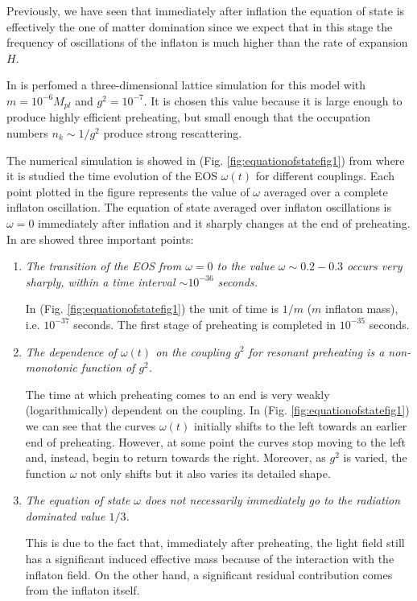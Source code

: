 \documentclass[11pt,a4paper,twoside]{book}
\begin{document}
Previously, we have seen that  immediately after inflation the equation of state is effectively the one of matter domination since we expect that in this stage the frequency of oscillations of the inflaton  is much higher than the rate of expansion $ H $.

In \cite{Chap7:Peloso_Thermalization} is perfomed a three-dimensional lattice simulation for this model with $ m=10^{-6} M_{pl} $ and $ g^{2}=10^{-7} $. It is chosen this value because it is large enough to produce highly efficient preheating, but small enough that the occupation numbers $ n_{k} \sim 1/g^{2}$ produce strong rescattering.

The numerical simulation is showed in (Fig. \ref{fig:equationofstatefig1}) from \cite{Chap7:Peloso_Thermalization} where it is studied the time evolution of the EOS $ \omega(t) $ for different couplings.
Each point plotted in the figure represents the value of $\omega$ averaged over a complete inflaton oscillation. The equation of state averaged over inflaton oscillations is $\omega = 0$ immediately after inflation and it sharply changes at the end of preheating. In \cite{Chap7:Peloso_Thermalization} are showed  three important points:
\begin{enumerate}
	\item \textit{The transition of the EOS from $\omega=0$ to the value $\omega \sim 0.2-0.3$ occurs very sharply, within a time interval $\sim 10^{-36}$ seconds.}
	
	In (Fig. \ref{fig:equationofstatefig1}) the unit of time is $ 1/m $ ($ m $ inflaton mass), i.e. $ 10^{-37} $ seconds. The first stage of preheating is completed in $ 10^{-35} $ seconds.
	\item \textit{The dependence of $\omega(t)$ on the coupling $ g^{2} $ for resonant preheating is a non-monotonic function of $ g^{2} $.}
	
	The time at which preheating comes to an end is very weakly (logarithmically) dependent on the coupling. In (Fig. \ref{fig:equationofstatefig1}) we can see that the curves $\omega(t)$ initially shifts to the left towards an earlier end of preheating. However, at some point the curves stop moving to the left and, instead, begin to return towards the right. Moreover, as $ g^{2} $ is varied, the function $\omega$ not only shifts but it also varies its detailed shape.
	\item \textit{The equation of state $\omega$ does not necessarily immediately go to the radiation dominated value $ 1/3 $.}
	
	This is due to the fact that, immediately after preheating, the light field still has a significant induced effective mass because of the interaction with the inflaton field. On the other hand, a significant residual contribution comes from the inflaton itself. 
\end{enumerate}
\end{document}
